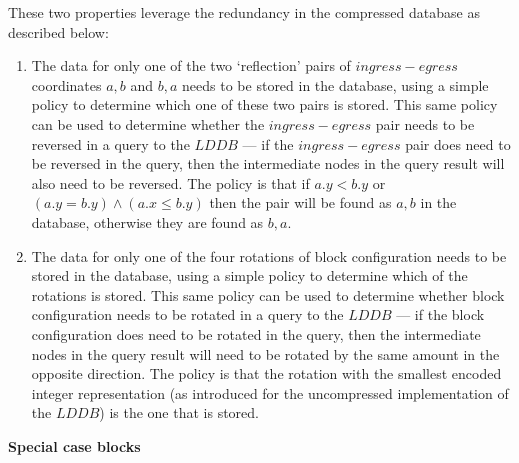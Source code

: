 \documentclass[12pt,notitlepage]{report}
\begin{document}
These two properties leverage the redundancy in the compressed database as described below:
\begin{enumerate}
\item The data for only one of the two `reflection' pairs of $ingress-egress$ coordinates $a,b$ and $b,a$ needs to be stored in the database, using a simple policy to determine which one of these two pairs is stored. This same policy can be used to determine whether the $ingress-egress$ pair needs to be reversed in a query to the $LDDB$ --- if the $ingress-egress$ pair does need to be reversed in the query, then the intermediate nodes in the query result will also need to be reversed. The policy is that if $a.y < b.y$ or $(a.y = b.y) \land (a.x \leq b.y)$ then the pair will be found as $a,b$ in the database, otherwise they are found as $b,a$.
\item The data for only one of the four rotations of block configuration needs to be stored in the database, using a simple policy  to determine which of the rotations is stored. This same policy can be used to determine whether block configuration needs to be rotated in a query to the $LDDB$ --- if the block configuration does need to be rotated in the query, then the intermediate nodes in the query result will need to be rotated by the same amount in the opposite direction. The policy is that the rotation with the smallest encoded integer representation (as introduced for the uncompressed implementation of the $LDDB$) is the one that is stored. 
\end{enumerate}

\noindent
{\bf Special case blocks}\\
\end{document}
